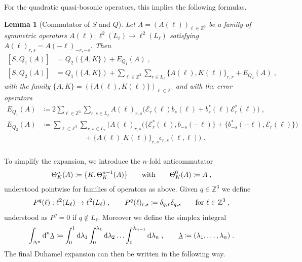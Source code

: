 \documentclass[12pt,a4paper]{article}
\numberwithin{equation}{section}
\newcommand{\Zbb}{\mathbb{Z}}
\newcommand{\ulambda}{\underline{\lambda}}
\newcommand{\1}{\mathbb{I}}
\newcommand{\di}{\textnormal{d}}
\newcommand{\Zstar}{\mathbb{Z}^3} %
\newcommand{\Z}{\mathbb{Z}}
\theoremstyle{plain}
\newtheorem{lemma}[theorem]{Lemma}
\theoremstyle{definition}
\theoremstyle{remark}
\theoremstyle{plain}
\theoremstyle{definition}
\theoremstyle{remark}
\begin{document}
For the quadratic quasi-bosonic operators, this implies the following formulas.

\begin{lemma}[Commutator of $S$ and $Q$]\label{lem:Q1Kcomm}
Let $ A = (A(\ell))_{\ell \in \Zstar} $ be a family of symmetric operators $ A(\ell) : \ell^2(L_\ell) \to \ell^2(L_\ell) $ satisfying $A(\ell)_{r,s} = A(-\ell)_{-r,-s}$. Then
\begin{equation}
\begin{aligned}
	[S, Q_1(A)] 
	&= Q_2(\{A,K\})
		+ E_{Q_1}(A) \;, \\
	[S, Q_2(A)] 
	&= Q_1\left(\{A,K\} \right) 
		+ \sum_{\ell \in \Zstar} \sum_{r \in L_{\ell}} \big\{ A(\ell), K(\ell) \big\}_{r,r}
		+ E_{Q_2}(A) \;,
\end{aligned}
\end{equation}
with the family $ \{A,K\} = (\{A(\ell),K(\ell)\})_{\ell \in \Zstar} $ and with the error operators
\begin{equation}\label{eq:errKQ}
\begin{aligned}
	E_{Q_1}(A)
	&\coloneq 2 \sum_{\ell \in \Zstar}\sum_{r,s \in L_{\ell}}A(\ell)_{r,s}\Big(\mathcal{E}_{r}(\ell)b_{s}(\ell) + b^*_{s}(\ell)\mathcal{E}^*_{r}(\ell)\Big) \;, \\
	E_{Q_2}(A)
	& \coloneq \sum_{\ell \in \Zstar}\sum_{r,s \in L_{\ell}}\Big(A(\ell)_{r,s}\big(\big\{\mathcal{E}^*_{r}(\ell), b_{-s}(-\ell)\big\}
		+ \big\{ b^*_{-s}(-\ell) , \mathcal{E}_r(\ell) \big\} \big) \\
		& \hspace{6em}
		+ \big\{A(\ell)_,K(\ell)\big\}_{r,s}\epsilon_{r,s}(\ell,\ell)\Big) \;. \\
\end{aligned} 
\end{equation}
\end{lemma}


To simplify the expansion, we introduce the $n$-fold anticommutator
\begin{equation} \label{eq:Theta}
	\Theta_K^n (A)
	\coloneq \{ K, \Theta_K^{n-1} (A) \} \qquad
	\textnormal{with} \qquad
	\Theta_K^0 (A)
	\coloneq A \;,
\end{equation}
understood pointwise for families of operators as above.
Given $q \in \Zbb^3$ we define
\begin{equation} \label{eq:Pq}
	P^q(\ell) : \ell^2(L_\ell) \to \ell^2(L_\ell) \;, \qquad
	P^q(\ell)_{r,s} \coloneq \delta_{q,r} \delta_{q,s} \qquad
	\textnormal{for } \ell \in \Zstar \;,
\end{equation}
understood as $ P^q = 0 $ if $ q \notin L_\ell $.
Moreover we define the simplex integral
\begin{equation} \label{eq:Deltan}
	\int_{\Delta^n} \di^n \ulambda
	\coloneq \int_0^1 \di \lambda_1 \int_0^{\lambda_1} \di \lambda_2 \ldots \int_0^{\lambda_{n-1}} \di \lambda_n \;, \qquad
	\ulambda \coloneq (\lambda_1, \ldots, \lambda_n) \;.
\end{equation}
 The final Duhamel expansion can then be written in the following way.
\end{document}
